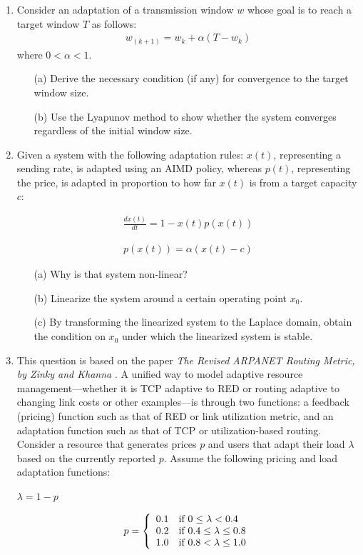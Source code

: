\documentclass{article}
\begin{document}
\begin{enumerate}
\item Consider an adaptation of a transmission window $w$ whose goal is to reach a target window $T$ as follows:
\begin{eqnarray*}
w_{(k+1)} =  w_k+ \alpha(T-w_k)
\end{eqnarray*}
where  $0 < \alpha < 1$. 
\begin{itemize}
\item[(a)] Derive the necessary condition (if any) for convergence to the target window size.
\item[(b)] Use the Lyapunov method to show whether the system converges regardless of the initial window size.
\end{itemize}

\item Given a system with the following adaptation rules: $x(t)$, representing a sending rate, is adapted using an AIMD policy, whereas $p(t)$, representing the price, is adapted in proportion to how far $x(t)$ is from a target capacity $c$:

\begin{eqnarray*}
\frac{d x(t)}{dt} = 1- x(t) p(x(t)) 
\end{eqnarray*}

\begin{eqnarray*}
p(x(t))= \alpha (x(t)-c)
\end{eqnarray*}

\begin{itemize}
\item[(a)] Why is that system non-linear?

\item[(b)] Linearize the system around a certain operating point $x_0$. 

\item[(c)] By transforming the linearized system to the Laplace domain, obtain the condition on $x_0$ under which the linearized system is stable.
\end{itemize}


\item 

This question is based on the paper {\em The Revised ARPANET
Routing Metric, by Zinky and Khanna} \cite{Khanna:1989}.
A unified way to model adaptive resource
management---whether it is TCP adaptive to RED or routing adaptive
to changing link costs or other examples---is through two
functions: a feedback (pricing) function such as that of RED or
link utilization metric, and an adaptation function such as that
of TCP or utilization-based routing. Consider a resource that
generates prices $p$ and users that adapt their load $\lambda$
based on the currently reported $p$. Assume the following pricing
and load adaptation functions: \begin{center} $\lambda = 1 - p$
\end{center} \[ p = \left\{ \begin{array}{ll}
       0.1 & \mbox{if $ 0 \leq \lambda < 0.4$} \\
       0.2  & \mbox{if $ 0.4 \leq \lambda \leq 0.8$} \\
       1.0  & \mbox{if $ 0.8 < \lambda \leq 1.0$}
       \end{array}
\right. \]


\end{enumerate}
\end{document}

